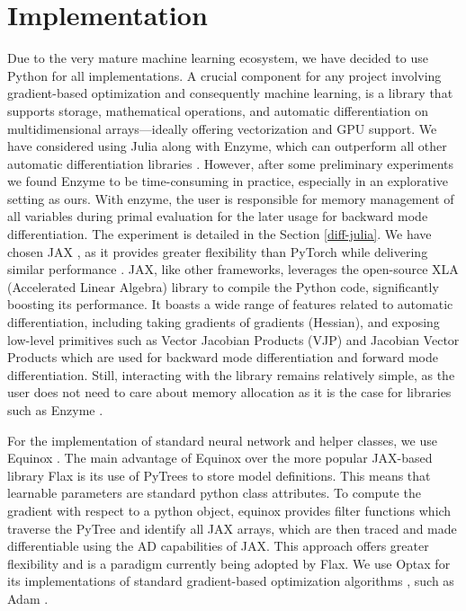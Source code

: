 \documentclass{article}
\begin{document}
\newpage
\section{Implementation}
\label{impl}

Due to the very mature machine learning ecosystem, we have decided to use Python for all implementations. A crucial component for any project involving gradient-based optimization and consequently machine learning, is a library that supports storage, mathematical operations, and automatic differentiation on multidimensional arrays—ideally offering vectorization and GPU support. We have considered using Julia along with Enzyme, which can outperform all other automatic differentiation libraries  \citep{enzyme1, enzyme2, enzyme3}. However, after some preliminary experiments we found Enzyme to be time-consuming in practice, especially in an explorative setting as ours. With enzyme, the user is responsible for memory management of all variables during primal evaluation for the later usage for backward mode differentiation. The experiment is detailed in the Section \ref{diff-julia}.  
We have chosen {JAX} \citep{jax2018github}, as it provides greater flexibility than PyTorch while delivering similar performance \citep{dion_hafner_2021_5607491}. JAX, like other frameworks, leverages the open-source XLA (Accelerated Linear Algebra) library to compile the Python code, significantly boosting its performance. It boasts a wide range of features related to automatic differentiation, including taking gradients of gradients (Hessian), and exposing low-level primitives such as Vector Jacobian Products (VJP) and Jacobian Vector Products which are used for backward mode differentiation and forward mode differentiation. Still, interacting with the library remains relatively simple, as the user does not need to care about memory allocation as it is the case for libraries such as Enzyme \citep{NEURIPS2020_9332c513}.

For the implementation of standard neural network and helper classes, we use Equinox \citep{kidger2021equinox}. The main advantage of Equinox over the more popular JAX-based library Flax \citep{flax2020github} is its use of PyTrees to store model definitions. This means that learnable parameters are standard python class attributes. To compute the gradient with respect to a python object, equinox provides filter functions which traverse the PyTree and identify all {JAX} arrays, which are then traced and made differentiable using the AD capabilities of JAX. This approach offers greater flexibility and is a paradigm currently being adopted by Flax. We use Optax for its implementations of standard gradient-based optimization algorithms \citep{deepmind2020jax}, such as Adam \citep{kingma2014adam}.
\end{document}
